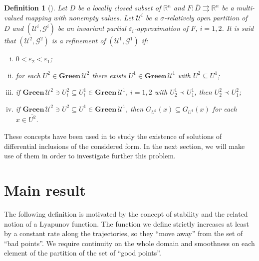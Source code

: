 \documentclass[a4paper]{article}
\newtheorem{definition}[thm]{Definition}
\begin{document}
\begin{definition}[\cite{KR}]
    Let $D$ be a locally closed subset of $\mathbb{R}^n$ and $F: \overline{D} \rightrightarrows \mathbb{R}^n$ be a multi-valued mapping with nonempty values. Let $\mathcal{U}^i$ be a $\sigma$-relatively open partition of $D$ and $(\mathcal{U}^i,\mathcal{G}^i)$ be an invariant partial $\varepsilon_i$-approximation of $F$, $i=1,2$. It is said that $(\mathcal{U}^2,\mathcal{G}^2)$ is a refinement of $(\mathcal{U}^1,\mathcal{G}^1)$ if:
    \begin{enumerate}[(i)]
        \item $0 < \varepsilon_2 < \varepsilon_1$;
        \item for each $U^2 \in \mathbf{Green} \,\mathcal{U}^2$ there exists $U^1 \in \mathbf{Green} \,\mathcal{U}^1$ with $U^2 \subseteq U^1$;
        \item if $\mathbf{Green} \,\mathcal{U}^2 \ni U^2_i \subseteq U^1_i \in \mathbf{Green} \,\mathcal{U}^1$, $i=1,2$ with $U^1_2 \prec U^1_1$, then $U^2_2 \prec U^2_1$;
        \item if $\mathbf{Green} \,\mathcal{U}^2 \ni U^2 \subseteq U^1 \in \mathbf{Green} \,\mathcal{U}^1$, then $G_{U^2}(x) \subseteq G_{U^1}(x)$ for each $x \in \overline{U^2}$.
    \end{enumerate}
\end{definition}

These concepts have been used in \cite{KR} to study the existence of solutions of differential inclusions of the considered form. In the next section, we will make use of them in order to investigate further this problem.

\section{Main result}\label{main}

The following definition is motivated by the concept of stability and the related notion of a Lyapunov function. The function we define strictly increases at least by a constant rate along the trajectories, so they ``move away'' from the set of ``bad points''. We require continuity on the whole domain and smoothness on each element of the partition of the set of ``good points''.
\end{document}
